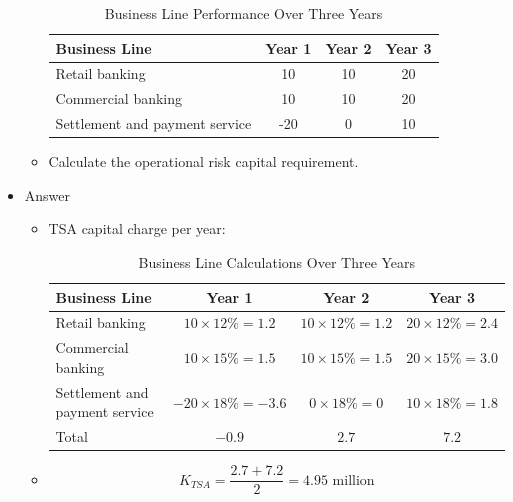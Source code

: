 \begin{itemize}
\begin{itemize}
    \begin{table}[h]
        \centering
        \caption{Business Line Performance Over Three Years}
        \begin{tabular}{|l|c|c|c|}
            \hline
            \textbf{Business Line} & \textbf{Year 1} & \textbf{Year 2} & \textbf{Year 3} \\
            \hline
            Retail banking & 10 & 10 & 20 \\
            Commercial banking & 10 & 10 & 20 \\
            Settlement and payment service & -20 & 0 & 10 \\
            \hline
        \end{tabular}
    \end{table}
    \item Calculate the operational risk capital requirement.
    \end{itemize}
    

\item Answer
    \begin{itemize}
    \item TSA capital charge per year:
    \begin{table}[h]
        \centering
        \caption{Business Line Calculations Over Three Years}
        \begin{tabular}{|l|c|c|c|}
            \hline
            \textbf{Business Line} & \textbf{Year 1} & \textbf{Year 2} & \textbf{Year 3} \\
            \hline
            Retail banking & \(10 \times 12\% = 1.2\) & \(10 \times 12\% = 1.2\) & \(20 \times 12\% = 2.4\) \\
            \hline
            Commercial banking & \(10 \times 15\% = 1.5\) & \(10 \times 15\% = 1.5\) & \(20 \times 15\% = 3.0\) \\
            \hline
            Settlement and payment service & \(-20 \times 18\% = -3.6\) & \(0 \times 18\% = 0\) & \(10 \times 18\% = 1.8\) \\
            \hline
            Total & \(-0.9\) & \(2.7\) & \(7.2\) \\
            \hline
        \end{tabular}
    \end{table}
    \item \begin{equation}
        K_{TSA} = \frac{2.7 + 7.2}{2} = 4.95 \text{ million}
        \end{equation}
    \end{itemize}


\end{itemize}
